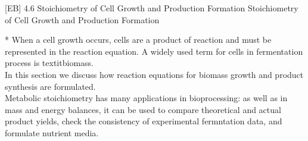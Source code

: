 \documentclass["EB-Notebook.tex"]{subfiles}
\begin{document}

\setcounter{bookone}{4}
\setcounter{booktwo}{6}
[EB]
{4.6 Stoichiometry of Cell Growth and Production Formation} %
{Stoichiometry of Cell Growth and Production Formation} %

\begin{sectionBox}*{} %
  When a cell growth occurs, cells are a product of reaction and must be represented in the reaction equation. A widely used term for cells in fermentation process is textit{biomass}.\\[1ex]
  In this section we discuss how reaction equations for biomass growth and product synthesis are formulated.\\[1ex]
  Metabolic stoichiometry has many applications in bioprocessing: as well as in mass and energy balances, it can be used to compare theoretical and actual product yields, check the consistency of experimental fermntation data, and formulate nutrient media.
\end{sectionBox}
\end{document}
